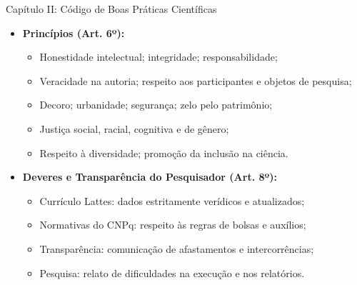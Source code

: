 \documentclass[aspectratio=169]{beamer}
\begin{document}
\begin{frame}[t]{Capítulo II: Código de Boas Práticas Científicas}
    \begin{itemize}
        \item \textbf{Princípios (Art. 6º):}
        \begin{itemize}
            \item Honestidade intelectual; integridade; responsabilidade;
            \item Veracidade na autoria; respeito aos participantes e objetos de pesquisa;
            \item Decoro; urbanidade; segurança; zelo pelo patrimônio;
            \item Justiça social, racial, cognitiva e de gênero;
            \item Respeito à diversidade; promoção da inclusão na ciência.
        \end{itemize}
        
        \vspace{0.4cm}
        
        \item \textbf{Deveres e Transparência do Pesquisador (Art. 8º):}
        \begin{itemize}
            \item Currículo Lattes: dados estritamente verídicos e atualizados;
            \item Normativas do CNPq: respeito às regras de bolsas e auxílios;
            \item Transparência: comunicação de afastamentos e intercorrências;
            \item Pesquisa: relato de dificuldades na execução e nos relatórios.
        \end{itemize}
    \end{itemize}
\end{frame}


    
\end{document}
